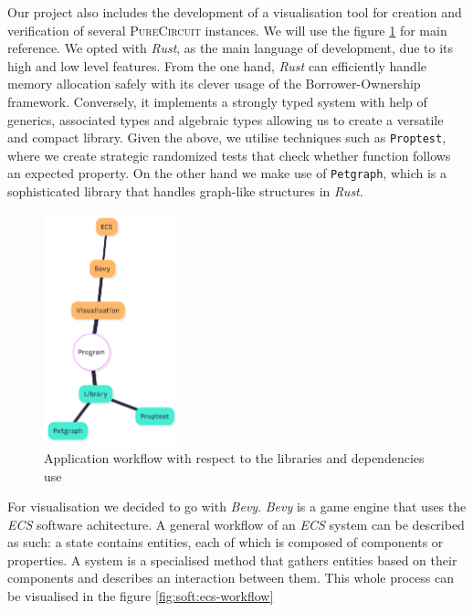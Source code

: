 Our project also includes the development of a visualisation tool for creation
and verification of several \textsc{PureCircuit} instances. We will use the
figure \ref{fig:soft:workflow} for main reference. We opted with \textit{Rust},
as the main language of development, due to its high and low level features.
From the one hand, \textit{Rust} can efficiently handle memory allocation safely
with its clever usage of the Borrower-Ownership framework. Conversely, it implements
a strongly typed system with help of generics, associated types and algebraic types
allowing us to create a versatile and compact library. Given the above, we utilise
techniques such as \texttt{Proptest}, where we create strategic randomized tests
that check whether  function follows an expected property. On the other hand
we make use of \texttt{Petgraph}, which is a sophisticated library that handles
graph-like structures in \textit{Rust}.



\begin{figure}[h!]
    \centering
    \includegraphics[width=0.35\textwidth]{assets/software-visualisation.png}
    \caption{Application workflow with respect to the libraries and dependencies use}
    \label{fig:soft:workflow}
\end{figure}


For visualisation we decided to go with \textit{Bevy}. \textit{Bevy} is a
game engine that uses the \textit{ECS} software achitecture. A general
workflow of an \textit{ECS} system can be described as such: a state 
contains entities, each of which is composed of components or properties.
A system is a specialised method that gathers entities based on their components
and describes an interaction between them. This whole process can be visualised
in the figure \ref{fig:soft:ecs-workflow}


